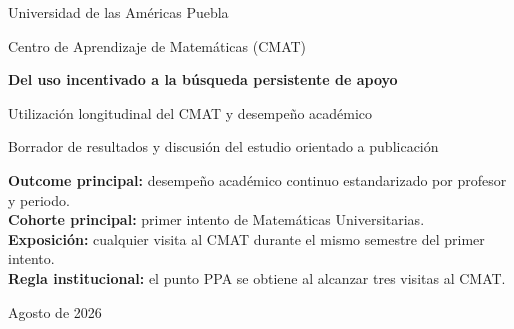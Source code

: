 \documentclass[11pt,letterpaper]{article}
\begin{document}
\begin{titlepage}
\centering
\vspace*{1.5cm}
{\Large Universidad de las Américas Puebla\par}
\vspace{0.35cm}
{\Large Centro de Aprendizaje de Matemáticas (CMAT)\par}
\vspace{1.8cm}
{\Huge\bfseries Del uso incentivado a la búsqueda persistente de apoyo\par}
\vspace{0.5cm}
{\LARGE Utilización longitudinal del CMAT y desempeño académico\par}
\vspace{0.8cm}
{\large Borrador de resultados y discusión del estudio orientado a publicación\par}
\vfill
\begin{tcolorbox}[colback=cmatlight,colframe=cmatblue,width=0.88\textwidth,boxrule=0.7pt]
\centering
\textbf{Outcome principal:} desempeño académico continuo estandarizado por profesor y periodo.\\[0.2cm]
\textbf{Cohorte principal:} primer intento de Matemáticas Universitarias.\\[0.2cm]
\textbf{Exposición:} cualquier visita al CMAT durante el mismo semestre del primer intento.\\[0.2cm]
\textbf{Regla institucional:} el punto PPA se obtiene al alcanzar tres visitas al CMAT.
\end{tcolorbox}
\vfill
{\large Agosto de 2026\par}
\end{titlepage}
\end{document}
